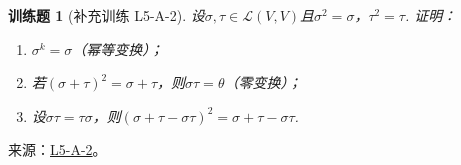\documentclass[UTF8,12pt,a4paper,fontset=fandol]{ctexart}
\newtheorem{exercise}{训练题}[section]
\begin{document}
\begin{exercise}[补充训练 L5-A-2]\label{prob:L5-A-2}
设$\sigma,\tau \in \mathcal{L}(V,V)$且$\sigma^2=\sigma$，$\tau^2=\tau$. 证明：
        \begin{enumerate}
            \item $\sigma^k=\sigma$（幂等变换）；

            \item 若$(\sigma+\tau)^2=\sigma+\tau$，则$\sigma\tau=\theta$（零变换）；

            \item 设$\sigma\tau=\tau\sigma$，则$(\sigma+\tau-\sigma\tau)^2=\sigma+\tau-\sigma\tau$.
        \end{enumerate}
\end{exercise}
\noindent 来源：\href{https://github.com/yhwu-is/Linear-Algebra-Left-Undone/blob/new/%E8%AE%B2%E4%B9%89/%E4%B8%93%E9%A2%98/5%20%E7%BA%BF%E6%80%A7%E6%98%A0%E5%B0%84.tex}{L5-A-2}。
\end{document}
